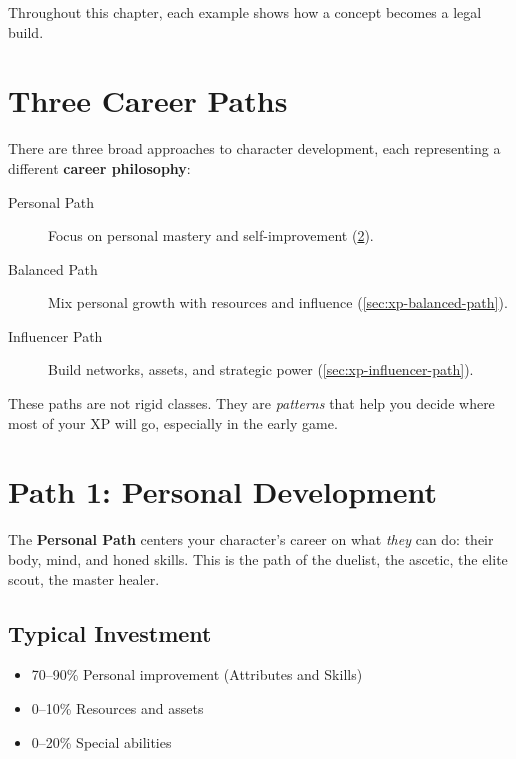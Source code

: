 Throughout this chapter, each example shows how a concept becomes a legal build.


\section{Three Career Paths}
\label{sec:xp-three-paths}

There are three broad approaches to character development, each representing a
different \textbf{career philosophy}:

\begin{description}
\item[Personal Path] Focus on personal mastery and self-improvement (\ref{sec:xp-personal-path}).
\item[Balanced Path] Mix personal growth with resources and influence (\ref{sec:xp-balanced-path}).
\item[Influencer Path] Build networks, assets, and strategic power (\ref{sec:xp-influencer-path}).
\end{description}

These paths are not rigid classes. They are \emph{patterns} that help you
decide where most of your XP will go, especially in the early game.


\section{Path 1: Personal Development}
\label{sec:xp-personal-path}

The \textbf{Personal Path} centers your character's career on what \emph{they}
can do: their body, mind, and honed skills. This is the path of the duelist,
the ascetic, the elite scout, the master healer.

\subsection*{Typical Investment}
\begin{itemize}
\item 70--90\% Personal improvement (Attributes and Skills)
\item 0--10\% Resources and assets
\item 0--20\% Special abilities
\end{itemize}


